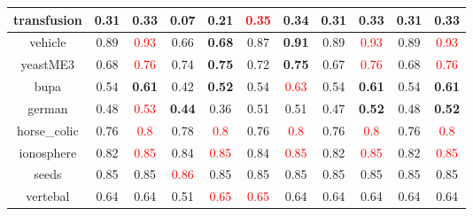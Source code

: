 \documentclass{article}%
\begin{document}
\begin{tabular}{c|cccccccccc}
\hline%
transfusion&0.31&\textbf{0.33}&0.07&\textbf{0.21}&\textcolor{red}{ 
0.35
}&0.34&0.31&\textbf{0.33}&0.31&\textbf{0.33}\\%
\hline%
vehicle&0.89&\textcolor{red}{ 
0.93
}&0.66&\textbf{0.68}&0.87&\textbf{0.91}&0.89&\textcolor{red}{ 
0.93
}&0.89&\textcolor{red}{ 
0.93
}\\%
\hline%
yeastME3&0.68&\textcolor{red}{ 
0.76
}&0.74&\textbf{0.75}&0.72&\textbf{0.75}&0.67&\textcolor{red}{ 
0.76
}&0.68&\textcolor{red}{ 
0.76
}\\%
\hline%
bupa&0.54&\textbf{0.61}&0.42&\textbf{0.52}&0.54&\textcolor{red}{ 
0.63
}&0.54&\textbf{0.61}&0.54&\textbf{0.61}\\%
\hline%
german&0.48&\textcolor{red}{ 
0.53
}&\textbf{0.44}&0.36&0.51&0.51&0.47&\textbf{0.52}&0.48&\textbf{0.52}\\%
\hline%
horse\_colic&0.76&\textcolor{red}{ 
0.8
}&0.78&\textcolor{red}{ 
0.8
}&0.76&\textcolor{red}{ 
0.8
}&0.76&\textcolor{red}{ 
0.8
}&0.76&\textcolor{red}{ 
0.8
}\\%
\hline%
ionosphere&0.82&\textcolor{red}{ 
0.85
}&0.84&\textcolor{red}{ 
0.85
}&0.84&\textcolor{red}{ 
0.85
}&0.82&\textcolor{red}{ 
0.85
}&0.82&\textcolor{red}{ 
0.85
}\\%
\hline%
seeds&0.85&0.85&\textcolor{red}{ 
0.86
}&0.85&0.85&0.85&0.85&0.85&0.85&0.85\\%
\hline%
vertebal&0.64&0.64&0.51&\textcolor{red}{ 
0.65
}&\textcolor{red}{ 
0.65
}&0.64&0.64&0.64&0.64&0.64\\%
\hline%
\end{tabular}

%
\end{document}
